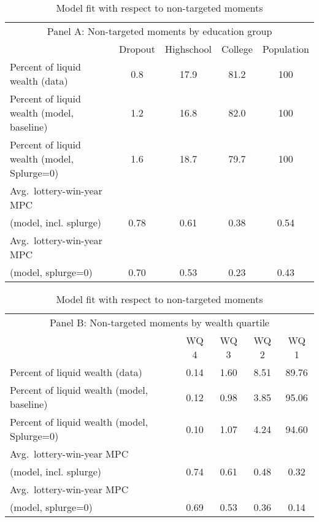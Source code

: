 \documentclass[\PathToRoot/\ProjectName]{subfiles}
\begin{document}
\begin{table}[tb] 
  \caption{Model fit with respect to non-targeted moments}
  \whenintegrated{\label{tab:nonTargetedMoments-wSplZero}} 
  \centering

  \begin{tabular*}
    {\textwidth}{@{\extracolsep{\fill}}lcccc@{}}
    \multicolumn{5}{c}{\small Panel A: Non-targeted moments by education group} \\
    \addlinespace
    \hline
    & Dropout & Highschool & College & Population \\ \hline
    Percent of liquid wealth (data)             & 0.8  & 17.9 & 81.2 & 100 \\
    Percent of liquid wealth (model, baseline)  & 1.2  & 16.8 & 82.0 & 100 \\
    Percent of liquid wealth (model, Splurge=0) & 1.6  & 18.7 & 79.7 & 100 \\
    \addlinespace
    Avg.\ lottery-win-year MPC \\ \quad (model, incl. splurge) & 0.78 & 0.61 & 0.38 & 0.54 \\
    Avg.\ lottery-win-year MPC \\ \quad (model, splurge=0)     & 0.70 & 0.53 & 0.23 & 0.43 \\
    \hline
  \end{tabular*}

  \vspace{0.5em}

  \begin{tabular*}
    {\textwidth}{@{\extracolsep{\fill}}lcccc@{}}
    \multicolumn{5}{c}{\small Panel B: Non-targeted moments by wealth quartile} \\
    \addlinespace
    \hline
    & WQ 4 & WQ 3 & WQ 2 & WQ 1 \\ \hline
    Percent of liquid wealth (data)             & 0.14 & 1.60 & 8.51 & 89.76 \\
    Percent of liquid wealth (model, baseline)  & 0.12 & 0.98 & 3.85 & 95.06 \\
    Percent of liquid wealth (model, Splurge=0) & 0.10 & 1.07 & 4.24 & 94.60 \\
    \addlinespace
    Avg.\ lottery-win-year MPC \\ \quad (model, incl. splurge) & 0.74 & 0.61 & 0.48 & 0.32 \\
    Avg.\ lottery-win-year MPC \\ \quad (model, splurge=0)     & 0.69 & 0.53 & 0.36 & 0.14 \\
    \hline
  \end{tabular*}


\end{table}
\end{document}

